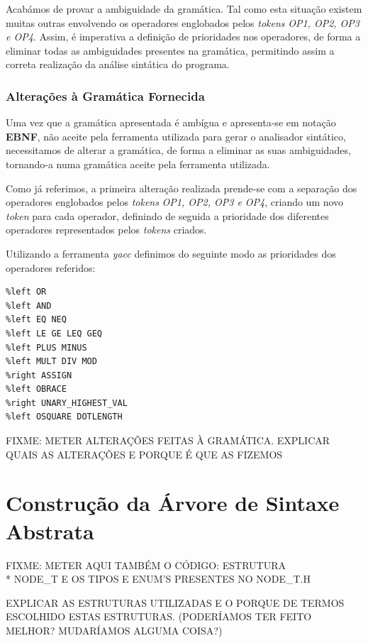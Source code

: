 \documentclass[11pt,a4paper]{article}
\begin{document}
Acabámos de provar a ambiguidade da gramática. Tal como esta situação existem muitas outras envolvendo os operadores englobados pelos \emph{tokens} \emph{OP1, OP2, OP3 e OP4}. Assim, é imperativa a definição de prioridades nos operadores, de forma a eliminar todas as ambiguidades presentes na gramática, permitindo assim a correta realização da análise sintática do programa.

\subsubsection{Alterações à Gramática Fornecida}

Uma vez que a gramática apresentada é ambígua e apresenta-se em notação \textbf{EBNF}, não aceite pela ferramenta utilizada para gerar o analisador sintático, necessitamos de alterar a gramática, de forma a eliminar as suas ambiguidades, tornando-a numa gramática aceite pela ferramenta utilizada.

Como já referimos, a primeira alteração realizada prende-se com a separação dos operadores englobados pelos \emph{tokens} \emph{OP1, OP2, OP3 e OP4}, criando um novo \emph{token} para cada operador, definindo de seguida a prioridade dos diferentes operadores representados pelos \emph{tokens} criados.

Utilizando a ferramenta \emph{yacc} definimos do seguinte modo as prioridades dos operadores referidos:

\begin{lstlisting}
%left OR
%left AND
%left EQ NEQ
%left LE GE LEQ GEQ
%left PLUS MINUS
%left MULT DIV MOD
%right ASSIGN
%left OBRACE
%right UNARY_HIGHEST_VAL
%left OSQUARE DOTLENGTH
\end{lstlisting}

FIXME: METER ALTERAÇÕES FEITAS À GRAMÁTICA. EXPLICAR QUAIS AS ALTERAÇÕES E PORQUE É QUE AS FIZEMOS

\pagebreak

\section{Construção da Árvore de Sintaxe Abstrata}

FIXME: METER AQUI TAMBÉM O CÓDIGO: ESTRUTURA \\* NODE\_T E OS TIPOS E ENUM'S PRESENTES NO NODE\_T.H

EXPLICAR AS ESTRUTURAS UTILIZADAS E O PORQUE DE TERMOS ESCOLHIDO ESTAS ESTRUTURAS. (PODERÍAMOS TER FEITO MELHOR? MUDARÍAMOS ALGUMA COISA?)
\end{document}
